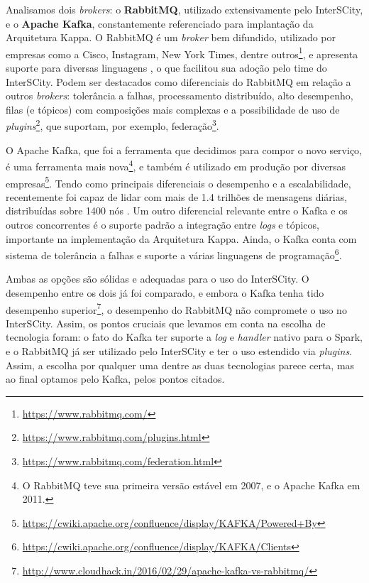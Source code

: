 Analisamos dois \textit{brokers}: o \textbf{RabbitMQ}, utilizado
extensivamente pelo InterSCity, e o \textbf{Apache Kafka}, constantemente
referenciado para implantação da Arquitetura Kappa. O RabbitMQ é um
\textit{broker} bem difundido, utilizado por empresas como a Cisco, Instagram,
New York Times, dentre outros\footnote{\url{https://www.rabbitmq.com/}},
e apresenta suporte para diversas linguagens \cite{zaitsev2014}, o que
facilitou sua adoção pelo time do InterSCity. Podem ser destacados como
diferenciais do RabbitMQ em relação a outros \textit{brokers}: tolerância a
falhas, processamento distribuído, alto desempenho, filas (e tópicos) com
composições mais complexas e a possibilidade de uso de
\textit{plugins}\footnote{\url{https://www.rabbitmq.com/plugins.html}},
que suportam, por exemplo,
federação\footnote{\url{https://www.rabbitmq.com/federation.html}}.

O Apache Kafka, que foi a ferramenta que decidimos para compor o novo serviço,
é uma ferramenta mais nova\footnote{O RabbitMQ teve
sua primeira versão estável em 2007, e o Apache Kafka em 2011.}, e também é
utilizado em produção por diversas
empresas\footnote{\url{https://cwiki.apache.org/confluence/display/KAFKA/Powered+By}}.
Tendo como principais diferenciais o desempenho e a escalabilidade,
recentemente foi capaz de lidar com mais de 1.4 trilhões de mensagens diárias,
distribuídas sobre 1400 nós \cite{koshy2016}. Um outro diferencial relevante
entre o Kafka e os outros concorrentes é o suporte padrão a integração entre
\textit{logs} e tópicos, importante na implementação da Arquitetura Kappa. Ainda,
o Kafka conta com sistema de tolerância a falhas e suporte a várias linguagens de
programação\footnote{\url{https://cwiki.apache.org/confluence/display/KAFKA/Clients}}.

Ambas as opções são sólidas e adequadas para o uso do InterSCity. O
desempenho entre os dois já foi comparado, e embora o Kafka tenha tido desempenho
superior\footnote{\url{http://www.cloudhack.in/2016/02/29/apache-kafka-vs-rabbitmq/}},
o desempenho do RabbitMQ não compromete o uso no InterSCity. Assim, os pontos
cruciais que levamos em conta na escolha de tecnologia foram: o fato do Kafka
ter suporte a \textit{log} e \textit{handler} nativo para o Spark, e o RabbitMQ
já ser utilizado pelo InterSCity e ter o uso estendido via \textit{plugins}.
Assim, a escolha por qualquer uma dentre as duas tecnologias parece certa, mas
ao final optamos pelo Kafka, pelos pontos citados.
